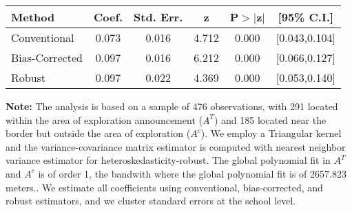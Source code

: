 \begin{table}[htbp]\centering
 \footnotesize 
\begin{tabular}{lccccc}
\hline\hline
Method & Coef. & Std. Err. & z & P$>|$z$|$ & [95\% C.I.] \\ 
\hline \hline  
Conventional & 0.073 & 0.016 & 4.712 & 0.000 & [0.043,0.104] \\ 
 Bias-Corrected & 0.097 & 0.016 & 6.212 & 0.000 & [0.066,0.127] \\ 
Robust & 0.097 & 0.022 & 4.369 & 0.000 & [0.053,0.140] \\ 
  \hline\hline
\end{tabular}
\label{table:rd}
\begin{tablenotes} 
  \justifying \tiny \textbf{Note: }    
   The analysis is based on a sample of 476 observations, with 291 located within the area of exploration announcement ($A^{T}$) and 185 located near the border but outside the area of exploration  ($A^{c}$). 
           We employ a Triangular kernel and the variance-covariance matrix estimator is computed with nearest neighbor variance estimator for heteroskedasticity-robust. The global polynomial fit in  $A^{T}$ and $A^{c}$ is of order 1, the bandwith where the global polynomial fit is of 2657.823 meters.. We estimate all coefficients using conventional, bias-corrected, and robust estimators, and we cluster standard errors at the school level. \end{tablenotes} 
 \end{table} 
